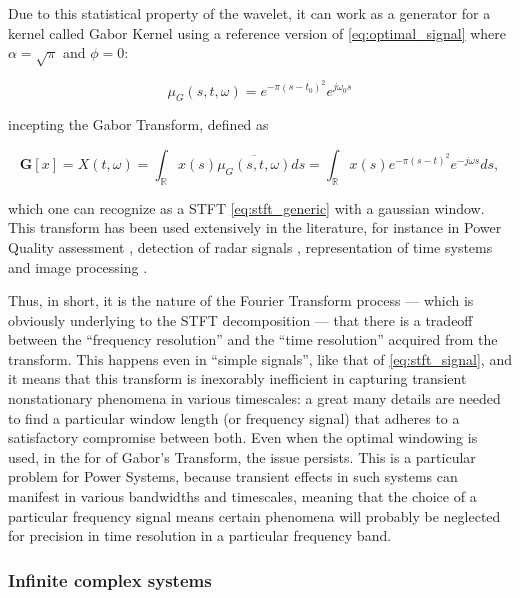 	Due to this statistical property of the wavelet, it can work as a generator for a kernel called Gabor Kernel using a reference version of \eqref{eq:optimal_signal} where $\alpha = \sqrt{\pi}$ and $\phi = 0$:

\begin{equation} \mu_G\left(s, t,\omega\right) = e^{-\pi\left(s - t_0\right)^2}e^{j\omega_0 s} \label{eq:gabor_kernel}\end{equation}

	\noindent incepting the Gabor Transform, defined as

\begin{equation} \mathbf{G}\left[x\right] = X\left(t,\omega\right) = \int_\mathbb{R} x(s)\overline{\mu_G\left(s, t,\omega\right)}ds = \int_\mathbb{R} x(s)e^{-\pi\left(s - t\right)^2}e^{-j\omega s}ds \label{eq:gabor_transform} ,\end{equation}

	\noindent which one can recognize as a STFT \eqref{eq:stft_generic} with a gaussian window. This transform has been used extensively in the literature, for instance in Power Quality assessment , detection of radar signals , representation of time systems  and image processing .

	Thus, in short, it is the nature of the Fourier Transform process — which is obviously underlying to the STFT decomposition — that there is a tradeoff between the ``frequency resolution'' and the ``time resolution'' acquired from the transform. This happens even in ``simple signals'', like that of \eqref{eq:stft_signal}, and it means that this transform is inexorably inefficient in capturing transient nonstationary phenomena in various timescales: a great many details are needed to find a particular window length (or frequency signal) that adheres to a satisfactory compromise between both. Even when the optimal windowing is used, in the for of Gabor's Transform, the issue persists. This is a particular problem for Power Systems, because transient effects in such systems can manifest in various bandwidths and timescales, meaning that the choice of a particular frequency signal means certain phenomena will probably be neglected for precision in time resolution in a particular frequency band.

\subsubsection{Infinite complex systems}\label{subsec:infinite_complex_systems} %

